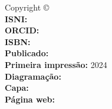 
\newpage
\thispagestyle{empty}

{\tiny%
\noindent Copyright \copyright\ \BookEditionYear\ \BookAuthor\\ %
\noindent \textbf{ISNI:} \AuthorNumberISNI\\
\noindent \textbf{ORCID:} \AuthorNumberOrcid\\


\noindent \textbf{ISBN:} \BookEditionISBN\\ %
\noindent \textbf{Publicado:} \BookPublishingEditor\\ %
\noindent \textbf{Primeira impressão:} 2024\\ %
\noindent \textbf{Diagramação:} \BookAuthor\\ %
\noindent \textbf{Capa:} \BookAuthor\\ %
\noindent \textbf{Página web:} \BookHomePage\\ %
\vfill



{
\SetBookAuthorLastName{\BookAuthorLastName}
\SetBookAuthorName{\BookAuthorName}
\SetBookAuthorYearBorn{\BookAuthorYearBorn}
\SetBookTitle{\BookTitle}
\SetBookSubTitle{\BookSubTitle}
\SetBookPublishingPlace{\BookLocalCountry}
\SetBookPublishingEditor{\BookPublishingEditor}
\SetBookPublishingYear{\BookEditionYear}
\SetBookPaperSize{\BookPaperWidth$\times$\BookPaperHeight}
\SetBookHasBibliography{\BookHasBibliography}
\SetBookISBN{\BookEditionISBN}
\SetBookKeyWordA{\BookKeyWordA}
\SetBookKeyWordB{\BookKeyWordB}
\SetBookKeyWordC{\BookKeyWordC}
\SetBookCDD{\BookCDD}
\SetBookCDU{\BookCDU}
\tiny
\centering
\CatalographicCard{12.5cm}
}
}
\newpage
